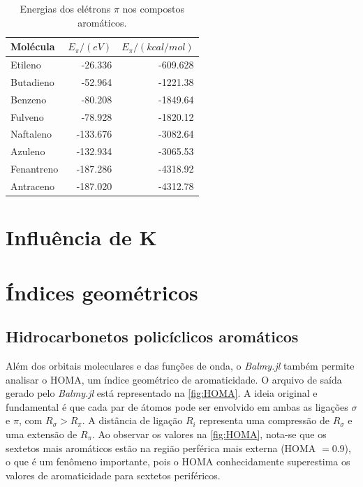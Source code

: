 \begin{table}[htb]
	\centering
	\caption{\label{tab:energies} Energias dos elétrons $\pi$ nos compostos aromáticos.}	
	\begin{tabular}{lrr}
		\toprule
		\textbf{Molécula} & $E_\pi / (eV)$ & $E_\pi / (kcal/mol)$
		\\ 
		\midrule
        Etileno & -26.336 & -609.628 \\
        Butadieno & -52.964 & -1221.38 \\
        Benzeno & -80.208 & -1849.64 \\
        Fulveno & -78.928 & -1820.12 \\
        Naftaleno & -133.676 & -3082.64 \\
        Azuleno & -132.934 & -3065.53 \\
        Fenantreno & -187.286 & -4318.92 \\
        Antraceno & -187.020 & -4312.78 \\
    \bottomrule
	\end{tabular}
\end{table}

\section{Influência de K}\label{wolfsberg}


\section{Índices geométricos}

\subsection{Hidrocarbonetos policíclicos aromáticos}

Além dos orbitais moleculares e das funções de onda, o \textit{Balmy.jl} também permite analisar o \gls{HOMA}, um índice geométrico de aromaticidade. O arquivo de saída gerado pelo \textit{Balmy.jl} está representado na \autoref{fig:HOMA}. A ideia original e fundamental é que cada par de átomos pode ser envolvido em ambas as ligações $\sigma$ e $\pi$, com $R_\sigma > R_\pi$. A distância de ligação $R_i$ representa uma compressão de $R_\sigma$ e uma extensão de $R_\pi$. Ao observar os valores na \autoref{fig:HOMA}, nota-se que os sextetos mais aromáticos estão na região perférica mais externa (\gls{HOMA} $= 0.9$), o que é um fenômeno importante, pois o \gls{HOMA} conhecidamente superestima os valores de aromaticidade para sextetos periféricos\autocite{giov2020}. 

